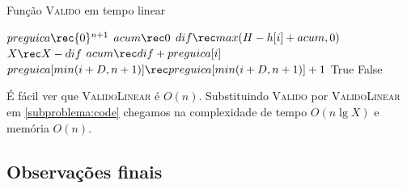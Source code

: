 \begin{algorithm}[H]
\caption{Função \textsc{Valido} em tempo linear}
\label{subproblema:code_linear}
\begin{algorithmic}[1]
    \State $preguica \rec \{0\}^{n + 1}$
    \State $acum \rec 0$
        \State $dif \rec max(H - h[i] + acum, 0)$
        \State $X \rec X - dif$
        \State $acum \rec dif + preguica[i]$
        \State $preguica[min(i + D, n + 1)] \rec preguica[min(i + D, n + 1)] + 1$
    \EndFor
        \Return True
    \Else
        \Return False
    \EndIf
\EndFunction
\end{algorithmic}
\end{algorithm}

É fácil ver que \textsc{ValidoLinear} é $O(n)$. Substituindo \textsc{Valido} por \textsc{ValidoLinear} em \ref{subproblema:code} chegamos na complexidade de tempo $O(n \lg X)$ e memória $O(n)$.

\subsection*{Observações finais}
